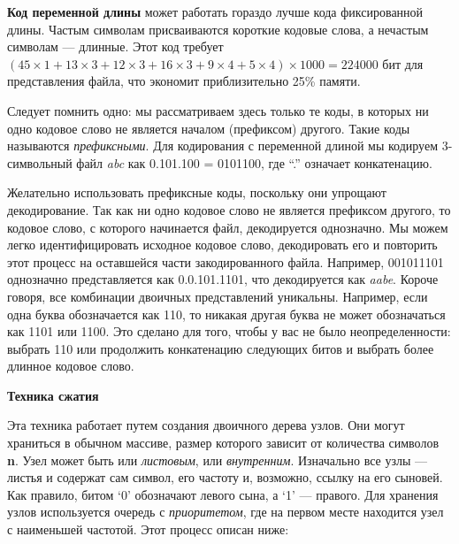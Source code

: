 \vspace{\baselineskip}
{\bfseries Код переменной длины} может работать гораздо лучше кода фиксированной длины. Частым символам присваиваются короткие кодовые слова, а нечастым символам --- длинные. Этот код требует $(45 \times 1 + 13 \times 3 + 12 \times 3 + 16 \times 3 + 9 \times 4 + 5 \times 4) \times 1000 = 224000$ бит для представления файла, что экономит приблизительно 25\% памяти.

\vspace{\baselineskip}
Следует помнить одно: мы рассматриваем здесь только те коды, в которых ни одно кодовое слово не является началом (префиксом) другого. Такие коды называются {\itshape префиксными}. Для кодирования с переменной длиной мы кодируем 3-символьный файл {\itshape abc} как 0.101.100 = 0101100, где “.” означает конкатенацию.

\vspace{\baselineskip}
Желательно использовать префиксные коды, поскольку они упрощают декодирование. Так как ни одно кодовое слово не является префиксом другого, то кодовое слово, с которого начинается файл, декодируется однозначно. Мы можем легко идентифицировать исходное кодовое слово, декодировать его и повторить этот процесс на оставшейся части закодированного файла. Например, 001011101 однозначно представляется как 0.0.101.1101, что декодируется как {\itshape aabe}. Короче говоря, все комбинации двоичных представлений уникальны. Например, если одна буква обозначается как 110, то никакая другая буква не может обозначаться как 1101 или 1100. Это сделано для того, чтобы у вас не было неопределенности: выбрать 110 или продолжить конкатенацию следующих битов и выбрать более длинное кодовое слово.

\vspace{\baselineskip}
{\bfseries Техника сжатия}

\vspace{\baselineskip}
Эта техника работает путем создания двоичного дерева узлов. Они могут храниться в обычном массиве, размер которого зависит от количества символов {\bfseries n}. Узел может быть или {\itshape листовым}, или {\itshape внутренним}. Изначально все узлы --- листья и содержат сам символ, его частоту и, возможно, ссылку на его сыновей. Как правило, битом ‘0’ обозначают левого сына, а ‘1’ --- правого. Для хранения узлов используется очередь с {\itshape приоритетом}, где на первом месте находится узел с наименьшей частотой. Этот процесс описан ниже:

